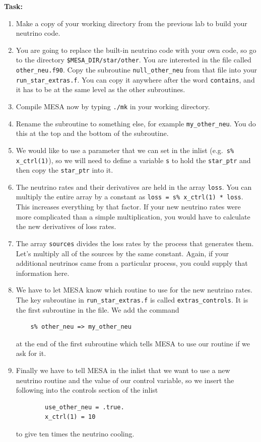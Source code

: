 \documentclass{article}
\begin{document}
\textbf{Task:}
\begin{enumerate}
 \setlength\itemsep{0em}
 \item 
Make a copy of your working directory from the previous lab to build your neutrino code.
\item 
You are going to replace the built-in neutrino code with your own code, so go to the directory \texttt{\$MESA\_DIR/star/other}.  You are interested in the file called \texttt{other\_neu.f90}.  Copy the subroutine \texttt{null\_other\_neu} from that file into your \texttt{run\_star\_extras.f}. You can copy it anywhere after the word \texttt{contains}, and it has to be at the same level as the other subroutines.
\item Compile MESA now by typing \texttt{./mk} in your working directory.
\item Rename the subroutine to something else, for example \texttt{my\_other\_neu}.  You do this at the top and the bottom of the subroutine.
\item 
We would like to use a parameter that we can set in the inlist (e.g.\ \texttt{s\% x\_ctrl(1)}), so we will need to define a variable \texttt{s} to hold the \texttt{star\_ptr} and then copy the \texttt{star\_ptr} into it.
\item 
The neutrino rates and their derivatives are held in the array \texttt{loss}.  You can multiply the entire array by a constant as \texttt{loss = s\% x\_ctrl(1) * loss}. This increases everything by that factor. If your new neutrino rates were more complicated than a simple multiplication, you would have to calculate the new derivatives of loss rates.
\item The array \texttt{sources} divides the loss rates by the process that generates them.  Let's multiply all of the sources by the same constant. Again, if your additional neutrinos came from a particular process, you could supply that information here.
\item
We have to let MESA know which routine to use for the new neutrino rates.  The key subroutine in \texttt{run\_star\_extras.f} is called \texttt{extras\_controls}.  It is the first subroutine in the file.  We add the command 
\begin{verbatim}
    s% other_neu => my_other_neu
\end{verbatim}
at the end of the first subroutine which tells MESA to use our routine if we ask for it.  
\item
Finally we have to tell MESA in the inlist that we want to use a new neutrino routine and the value of our control variable, so we insert the following into the controls section of the inlist
\begin{verbatim}
        use_other_neu = .true.
        x_ctrl(1) = 10
\end{verbatim}
to give ten times the neutrino cooling.
\end{enumerate}
\end{document}
